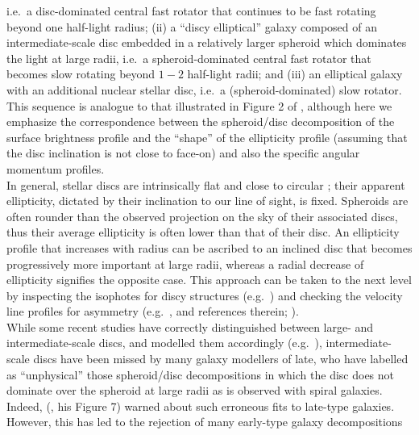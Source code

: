 \documentclass[useAMS,usenatbib,article]{mnras}
\begin{document}
{i.e.~a disc-dominated central fast rotator that continues to be fast rotating beyond one half-light radius; 
(ii) a ``discy elliptical'' galaxy \citep{michard1984,nieto1988} 
composed of an intermediate-scale disc embedded in a relatively larger spheroid which dominates the light at large radii,
i.e.~a spheroid-dominated central fast rotator that becomes slow rotating beyond $1-2$ half-light radii; and  
(iii) an elliptical galaxy with an additional nuclear stellar disc, 
i.e.~a (spheroid-dominated) slow rotator. 
This sequence is analogue to that illustrated in Figure 2 of \cite{cappellari2011kmdr}, 
although here we emphasize the correspondence between the spheroid/disc decomposition of the surface brightness profile 
and the ``shape'' of the ellipticity profile (assuming that the disc inclination is not close to face-on) 
and also the specific angular momentum profiles. \\
In general, stellar discs are intrinsically flat and close to circular \citep{Andersen2001,AndersenBershady2002}; 
their apparent ellipticity, dictated by their inclination to our line of sight, is fixed. 
Spheroids are often rounder than the observed projection on the sky of their associated discs, 
thus their average ellipticity is often lower than that of their disc. 
An ellipticity profile that increases with radius can be ascribed to an inclined disc that becomes progressively more important at large radii, 
whereas a radial decrease of ellipticity signifies the opposite case. 
This approach can be taken to the next level by inspecting the isophotes for discy structures 
(e.g.~\citealt{carter1978,carter1987,capaccioli1987,jedrzejewski1987,BenderMoellenhoff1987}) 
and checking the velocity line profiles for asymmetry 
(e.g.~\citealt{franxillingworth1988ic1459,bender1990,rixwhite1992,scorzabender1995}, and references therein; \citealt{scorza1998}). \\
While some recent studies have correctly distinguished between large- and intermediate-scale discs, 
and modelled them accordingly (e.g.~\citealt{kormendybender2012,krajnovic2013}), 
intermediate-scale discs have been missed by many galaxy modellers of late, 
who have labelled as ``unphysical'' \citep{allen2006} those spheroid/disc decompositions 
in which the disc does not dominate over the spheroid at large radii 
as is observed with spiral galaxies. 
Indeed, \citeauthor{graham2001} (\citeyear{graham2001}, his Figure 7) warned about such erroneous fits to late-type galaxies. 
However, this has led to the rejection of many early-type galaxy decompositions 
}
\end{document}
